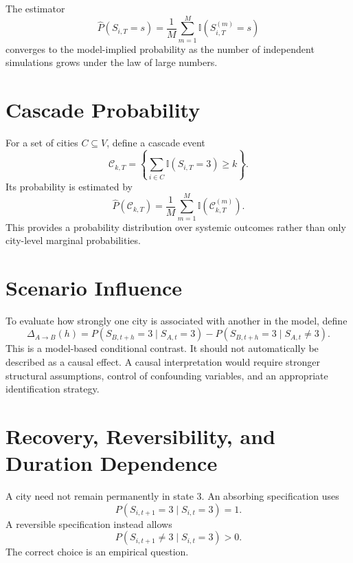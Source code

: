 \documentclass[11pt,letterpaper]{article}
\begin{document}
The estimator
\begin{equation}
\widehat P(S_{i,T}=s)=\frac{1}{M}\sum_{m=1}^{M}\mathbb{I}(S_{i,T}^{(m)}=s)
\label{eq:mc-estimator}
\end{equation}
converges to the model-implied probability as the number of independent simulations grows under the law of large numbers.

\section{Cascade Probability}
For a set of cities $C\subseteq V$, define a cascade event
\begin{equation}
\mathcal{C}_{k,T}=\left\{\sum_{i\in C}\mathbb{I}(S_{i,T}=3)\geq k\right\}.
\end{equation}
Its probability is estimated by
\begin{equation}
\widehat P(\mathcal{C}_{k,T})=\frac{1}{M}\sum_{m=1}^{M}\mathbb{I}(\mathcal{C}_{k,T}^{(m)}).
\end{equation}
This provides a probability distribution over systemic outcomes rather than only city-level marginal probabilities.

\section{Scenario Influence}
To evaluate how strongly one city is associated with another in the model, define
\begin{equation}
\Delta_{A\rightarrow B}(h)
=
P(S_{B,t+h}=3\mid S_{A,t}=3)
-
P(S_{B,t+h}=3\mid S_{A,t}\neq3).
\label{eq:scenario-influence}
\end{equation}
This is a model-based conditional contrast. It should not automatically be described as a causal effect. A causal interpretation would require stronger structural assumptions, control of confounding variables, and an appropriate identification strategy.

\section{Recovery, Reversibility, and Duration Dependence}
A city need not remain permanently in state 3. An absorbing specification uses
\begin{equation}
P(S_{i,t+1}=3\mid S_{i,t}=3)=1.
\end{equation}
A reversible specification instead allows
\begin{equation}
P(S_{i,t+1}\neq3\mid S_{i,t}=3)>0.
\end{equation}
The correct choice is an empirical question.
\end{document}

